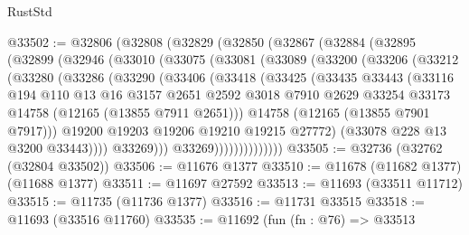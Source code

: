 \begin{lexlean}{RustStd}
\begin{coremodule}
@33502 := @32806
    (@32808
      (@32829
        (@32850
          (@32867
            (@32884
              (@32895
                (@32899
                  (@32946
                    (@33010
                      (@33075
                        (@33081
                          (@33089
                            (@33200
                              (@33206
                                (@33212
                                  (@33280
                                    (@33286
                                      (@33290
                                        (@33406
                                          (@33418
                                            (@33425
                                              (@33435
                                                @33443
                                                (@33116
                                                  @194
                                                  @110
                                                  @13
                                                  @16
                                                  @3157
                                                  @2651
                                                  @2592
                                                  @3018
                                                  @7910
                                                  @2629
                                                  @33254
                                                  @33173
                                                  @14758
                                                  (@12165 (@13855 @7911 @2651)))
                                                @14758
                                                (@12165 (@13855 @7901 @7917)))
                                              @19200
                                              @19203
                                              @19206
                                              @19210
                                              @19215
                                              @27772)
                                            (@33078 @228 @13 @3200 @33443))))
                                      @33269)))
                                @33269))))))))))))))
@33505 := @32736 (@32762 (@32804 @33502))
@33506 := @11676 @1377
@33510 := @11678 (@11682 @1377) (@11688 @1377)
@33511 := @11697 @27592
@33513 := @11693 (@33511 @11712)
@33515 := @11735 (@11736 @1377)
@33516 := @11731 @33515
@33518 := @11693 (@33516 @11760)
@33535 := @11692
    (fun (fn : @76) =>
    @33513

\end{coremodule}
\end{lexlean}
